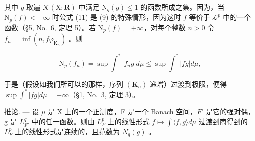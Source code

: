 其中 \(g\) 取遍 \(\mathcal{K}(\mathrm{X};\mathbf{R})\) 中满足 \(\mathrm{N}_q(g)\leqslant 1\) 的函数所成之集。因为，当 \(\mathrm{N}_p(f) < +\infty\) 时公式 (11) 是 (9) 的特殊情形，因为这时 \(f\) 等价于 \(\mathcal{L}^p\) 中的一个函数（§5, No.~6, 定理 5）。若 \(\mathrm{N}_p(f) = +\infty\)，对每个整数 \(n > 0\) 令 \(f_{n} = \inf (n,f\varphi_{\mathrm{K}_{n}})\) 。则

\[
\mathrm{N} _ {p} (f _ {n}) = \sup \int^ {*} | f _ {n} g | d \mu \leqslant \sup \int^ {*} | f g | d \mu ,
\]

于是（假设如我们所可以的那样，序列 \((\mathbf{K}_n)\) 递增）过渡到极限，便得 \(\sup \int^{*}|fg| d\mu = +\infty\)（§1, No.~3, 定理 3）。

推论. --- 设 \(\mu\) 是 X 上的一个正测度，F 是一个 Banach 空间，\(F'\) 是它的强对偶，g 是 \(L_{F'}^{q}\) 中的任一函数。则由 \(L_{F}^{p}\) 上的线性形式 \(f \mapsto \int \langle f, g \rangle d\mu\) 过渡到商得到的 \(L_{F}^{p}\) 上的线性形式是连续的，且范数为 \(N_{q}(g)\) 。

